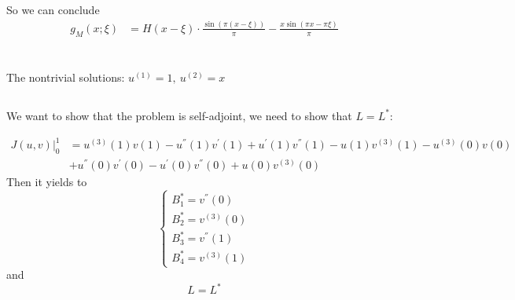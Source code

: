 \documentclass{article}
\begin{document}
So we can conclude
\begin{align*}
	g_M(x;\xi)&= H(x-\xi)\cdot \frac{\sin \left( \pi (x- \xi) \right)}{\pi}- \frac{x\sin(\pi x - \pi \xi)}{\pi}
\end{align*}
\section{}
\subsection{}
The nontrivial solutions: $u^{(1)}=1,\ u^{(2)}=x$
\newpage
\subsection{}
We want to show that the problem is self-adjoint, we need to show that $L=L^*$:


\begin{align*}
	J\left(u,v\right){\vert{}}_0^1&=u^{\left(3\right)}\left(1\right)v\left(1\right)-u^{''}\left(1\right)v^{'}\left(1\right)+u^{'}\left(1\right)v^{''}\left(1\right)-u\left(1\right)v^{\left(3\right)}\left(1\right)-u^{\left(3\right)}\left(0\right)v\left(0\right)\\
&+u^{''}\left(0\right)v^{'}\left(0\right)-u^{'}\left(0\right)v^{''}\left(0\right)+u\left(0\right)v^{\left(3\right)}\left(0\right)
\end{align*}
Then it yields to
\[
\left\{\begin{array}{l}B_1^*=v^{''}\left(0\right) \\
B_2^*=v^{\left(3\right)}\left(0\right) \\
B_3^*=v^{''}\left(1\right) \\
B_4^*=v^{\left(3\right)}\left(1\right)\end{array}\right.
\]
and
\[
L=L^*
\]
\end{document}
